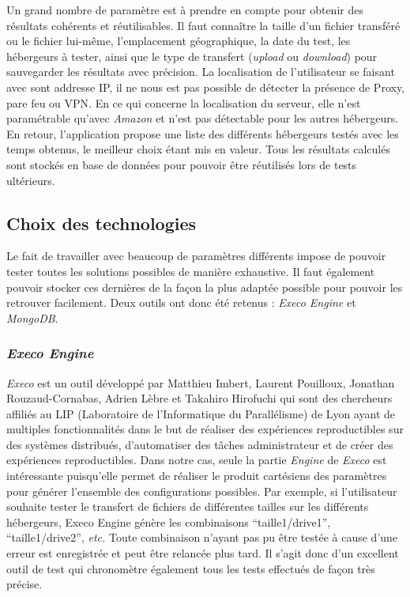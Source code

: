 \documentclass[10pt]{article}
\begin{document}
Un grand nombre de paramètre est à prendre en compte pour obtenir des résultats
cohérents et réutilisables. Il faut connaître la taille d'un fichier transféré
ou le fichier lui-même, l'emplacement géographique, la date du test, les hébergeurs à tester, ainsi que le type de transfert
(\textit{upload} ou \textit{download}) pour sauvegarder les résultats avec
précision. La localisation de l'utilisateur se faisant avec sont addresse IP, il ne nous est pas possible de détecter la présence de Proxy, pare feu ou VPN. En ce qui concerne la localisation du serveur, elle n'est paramétrable qu'avec \textit{Amazon} et n'est pas détectable pour les autres hébergeurs. En retour, l'application propose une liste des différents hébergeurs
testés avec les temps obtenus, le meilleur choix étant mis en valeur. Tous les
résultats calculés sont stockés en base de données pour pouvoir être réutilisés
lors de tests ultérieurs.

  
\subsection{Choix des technologies}

Le fait de travailler avec beaucoup de paramètres différents impose de pouvoir
tester toutes les solutions possibles de manière exhaustive. Il faut également
pouvoir stocker ces dernières de la façon la plus adaptée possible pour pouvoir
les retrouver facilement. Deux outils ont donc été retenus : \textit{Execo
Engine} et \textit{MongoDB}.

\subsubsection{\textit{Execo Engine}}

\textit{Execo} est un outil développé par Matthieu Imbert, Laurent Pouilloux,
Jonathan Rouzaud-Cornabas, Adrien Lèbre et Takahiro Hirofuchi qui sont des
chercheurs affiliés au LIP (Laboratoire de l'Informatique du Parallélisme)  de
Lyon ayant de multiples fonctionnalités dans le but de réaliser des expériences
reproductibles sur des systèmes distribués, d'automatiser des tâches
administrateur et de créer des expériences reproductibles. Dans notre cas,
seule la partie \textit{Engine} de \textit{Execo} est intéressante puisqu'elle
permet de réaliser le produit cartésiens des paramètres pour générer l'ensemble
des configurations possibles. Par exemple, si l'utilisateur souhaite tester le
transfert de fichiers de différentes tailles sur les différents hébergeurs,
Execo Engine génère les combinaisons ``taille1/drive1'', ``taille1/drive2'',
\textit{etc.} Toute combinaison n'ayant pas pu être testée à cause d'une erreur
est enregistrée et peut être relancée plus tard. Il s'agit donc d'un excellent
outil de test qui chronomètre également tous les tests effectués de façon très
précise.
\end{document}
